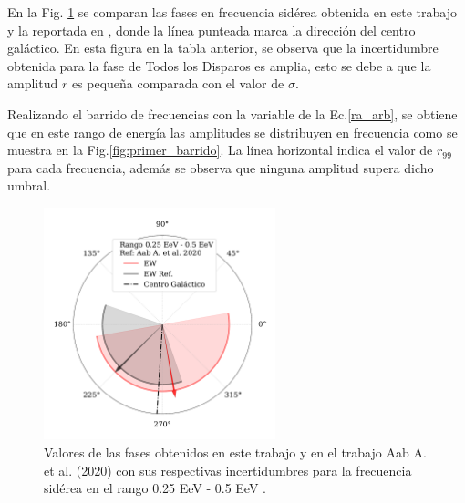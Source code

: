 En la Fig. \ref{fig:primer} se comparan las  fases en frecuencia sidérea obtenida en este trabajo y la reportada en \cite{Aab_2020}, donde la línea punteada marca la dirección del centro galáctico.  En esta figura en la tabla anterior, se observa que la incertidumbre obtenida para la fase de Todos los Disparos es amplia, esto se debe a que la amplitud $r$ es pequeña comparada con el valor de $\sigma$. 


Realizando el barrido de frecuencias con la variable de la Ec.\ref{ra_arb}, se obtiene que en este rango de energía las amplitudes se  distribuyen en frecuencia como se muestra en la Fig.\ref{fig:primer_barrido}. La línea horizontal indica el valor de $r_{99}$ para cada frecuencia, además se observa que ninguna amplitud supera dicho umbral.

\begin{figure}[H]
    \begin{small}
        \begin{center}
            \includegraphics[width=0.6\textwidth]{phase_primer_bin_v3.pdf}
            \vspace*{-1 cm}
        \end{center}
        \caption{Valores de las fases obtenidos en este trabajo y en el trabajo Aab A. et al. (2020) \cite{Aab_2020} con sus respectivas incertidumbres para la frecuencia sidérea en el  rango 0.25 EeV - 0.5 EeV .}
        \label{fig:primer}
    \end{small}
\end{figure}

